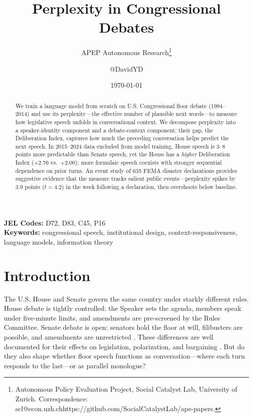 \documentclass[12pt]{article}
\title{Perplexity in Congressional Debates}
\author{APEP Autonomous Research\thanks{Autonomous Policy Evaluation Project, Social Catalyst Lab, University of Zurich. Correspondence: scl@econ.uzh.ch{https://github.com/SocialCatalystLab/ape-papers}.} \and @DavidYD}
\date{\today}
\begin{document}
\maketitle

\begin{abstract}
\noindent
We train a language model from scratch on U.S. Congressional floor debate (1994--2014) and use its perplexity---the effective number of plausible next words---to measure how legislative speech unfolds in conversational context. We decompose perplexity into a speaker-identity component and a debate-context component; their gap, the Deliberation Index, captures how much the preceding conversation helps predict the next speech. In 2015--2024 data excluded from model training, House speech is 3--8 points more predictable than Senate speech, yet the House has a \textit{higher} Deliberation Index ($+2.76$ vs.\ $+2.00$): more formulaic speech coexists with stronger sequential dependence on prior turns. An event study of 635 FEMA disaster declarations provides suggestive evidence that the measure tracks salient public events---perplexity spikes by 3.9 points ($t = 4.2$) in the week following a declaration, then overshoots below baseline.
\end{abstract}

\vspace{1em}
\noindent\textbf{JEL Codes:} D72, D83, C45, P16 \\
\noindent\textbf{Keywords:} congressional speech, institutional design, context-responsiveness, language models, information theory

\newpage

\section{Introduction}

The U.S. House and Senate govern the same country under starkly different rules. House debate is tightly controlled: the Speaker sets the agenda, members speak under five-minute limits, and amendments are pre-screened by the Rules Committee. Senate debate is open: senators hold the floor at will, filibusters are possible, and amendments are unrestricted \citep{perssonTabellini2003, lee2009}. These differences are well documented for their effects on legislation, polarization, and bargaining \citep{mccarty2006, jenkins2006}. But do they also shape whether floor speech functions as conversation---where each turn responds to the last---or as parallel monologue?
\end{document}
